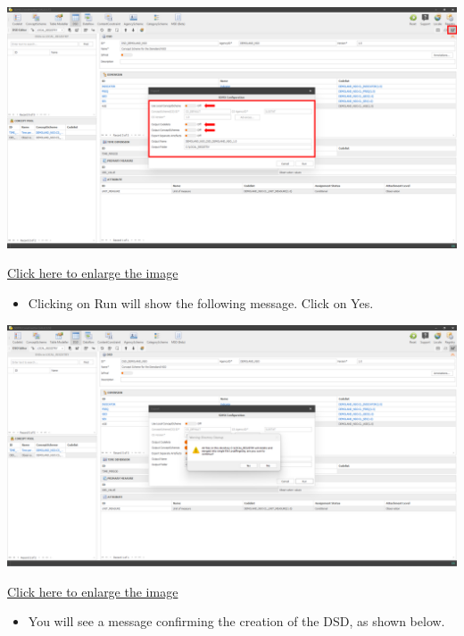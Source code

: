 \documentclass[
]{book}
\providecommand{\tightlist}{%
  \setlength{\itemsep}{0pt}\setlength{\parskip}{0pt}}
\begin{document}
\begin{center}\includegraphics[width=1\linewidth]{./images/image255} \end{center}

\href{images/image255.png}{Click here to enlarge the image}

\begin{itemize}
\tightlist
\item
  Clicking on Run will show the following message. Click on Yes.
\end{itemize}

\begin{center}\includegraphics[width=1\linewidth]{./images/image256} \end{center}

\href{images/image256.png}{Click here to enlarge the image}

\begin{itemize}
\tightlist
\item
  You will see a message confirming the creation of the DSD, as shown below.
\end{itemize}
\end{document}
